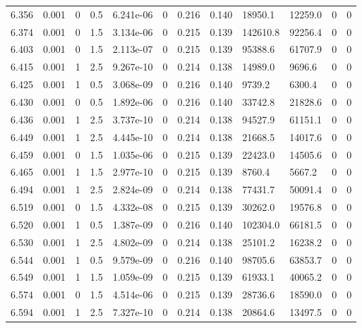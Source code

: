 \documentclass[preview]{standalone}
\begin{document}
{{{{{{{{{{{\begin{tabular}{L{1.2cm}C{1.2cm} C{0.3cm}C{0.5cm} C{1.4cm}C{1.4cm} C{1.4cm}C{1.4cm} C{1.6cm}C{1.6cm} C{1.6cm}C{1.6cm}}
  6.356  &  0.001  & 0     & 0.5 &  6.241e-06  & 0  &  0.216&   0.140& 18950.1 & 12259.0   &  0 & 0  \\ 
  6.374  &  0.001  & 0     & 1.5 &  3.134e-06  & 0  &  0.215&   0.139& 142610.8 & 92256.4   &  0 & 0  \\ 
  6.403  &  0.001  & 0     & 1.5 &  2.113e-07  & 0  &  0.215&   0.139& 95388.6 & 61707.9   &  0 & 0  \\ 
  6.415  &  0.001  & 1     & 2.5 &  9.267e-10  & 0  &  0.214&   0.138& 14989.0 & 9696.6   &  0 & 0  \\ 
  6.425  &  0.001  & 1     & 0.5 &  3.068e-09  & 0  &  0.216&   0.140& 9739.2 & 6300.4   &  0 & 0  \\ 
  6.430  &  0.001  & 0     & 0.5 &  1.892e-06  & 0  &  0.216&   0.140& 33742.8 & 21828.6   &  0 & 0  \\ 
  6.436  &  0.001  & 1     & 2.5 &  3.737e-10  & 0  &  0.214&   0.138& 94527.9 & 61151.1   &  0 & 0  \\ 
  6.449  &  0.001  & 1     & 2.5 &  4.445e-10  & 0  &  0.214&   0.138& 21668.5 & 14017.6   &  0 & 0  \\ 
  6.459  &  0.001  & 0     & 1.5 &  1.035e-06  & 0  &  0.215&   0.139& 22423.0 & 14505.6   &  0 & 0  \\ 
  6.465  &  0.001  & 1     & 1.5 &  2.977e-10  & 0  &  0.215&   0.139& 8760.4 & 5667.2   &  0 & 0  \\ 
  6.494  &  0.001  & 1     & 2.5 &  2.824e-09  & 0  &  0.214&   0.138& 77431.7 & 50091.4   &  0 & 0  \\ 
  6.519  &  0.001  & 0     & 1.5 &  4.332e-08  & 0  &  0.215&   0.139& 30262.0 & 19576.8   &  0 & 0  \\ 
  6.520  &  0.001  & 1     & 0.5 &  1.387e-09  & 0  &  0.216&   0.140& 102304.0 & 66181.5   &  0 & 0  \\ 
  6.530  &  0.001  & 1     & 2.5 &  4.802e-09  & 0  &  0.214&   0.138& 25101.2 & 16238.2   &  0 & 0  \\ 
  6.544  &  0.001  & 1     & 0.5 &  9.579e-09  & 0  &  0.216&   0.140& 98705.6 & 63853.7   &  0 & 0  \\ 
  6.549  &  0.001  & 1     & 1.5 &  1.059e-09  & 0  &  0.215&   0.139& 61933.1 & 40065.2   &  0 & 0  \\ 
  6.574  &  0.001  & 0     & 1.5 &  4.514e-06  & 0  &  0.215&   0.139& 28736.6 & 18590.0   &  0 & 0  \\ 
  6.594  &  0.001  & 1     & 2.5 &  7.327e-10  & 0  &  0.214&   0.138& 20864.6 & 13497.5   &  0 & 0  \\ 

\end{tabular}}}}}}}}}}}}
\end{document}
